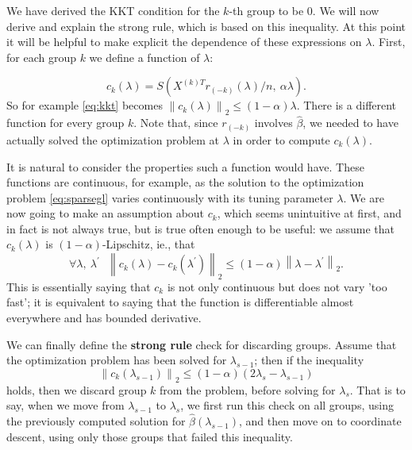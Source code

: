 \documentclass[12pt]{article}
\newcommand{\norm}[1]{\left\lVert #1 \right\rVert}
\begin{document}
We have derived the KKT condition for the $k$-th group to be $0$. We will now derive and explain the strong rule, which is based on this inequality. At this point it will be helpful to make explicit the dependence of these expressions on $\lambda$. First, for each group $k$ we define a function of $\lambda$:

\begin{equation}
c_k(\lambda) = S(X^{(k)T}r_{(-k)}(\lambda)/n,\ \alpha\lambda).
\end{equation}
So for example \autoref{eq:kkt} becomes $\norm{c_k(\lambda)}_2 \leq (1-\alpha)\lambda$. There is a different function for every group $k$. Note that, since $r_{(-k)}$ involves $\hat{\beta}$, we needed to have actually solved the optimization problem at $\lambda$ in order to compute $c_k(\lambda)$.

It is natural to consider the properties such a function would have. These functions are continuous, for example, as the solution to the optimization problem \autoref{eq:sparsegl} varies continuously with its tuning parameter $\lambda$. We are now going to make an assumption about $c_k$, which seems unintuitive at first, and in fact is not always true, but is true often enough to be useful: we assume that $c_k(\lambda)$ is $(1-\alpha)$-Lipschitz, ie., that
\begin{equation}
\label{eq:lipschitz}
\forall \lambda,\ \lambda^{\prime}\ \  \ \norm{c_k(\lambda)-c_k(\lambda^{\prime})}_2 \leq (1-\alpha)\norm{\lambda - \lambda^{\prime}}_2.
\end{equation}
This is essentially saying that $c_k$ is not only continuous but does not vary 'too fast'; it is equivalent to saying that the function is differentiable almost everywhere and has bounded derivative.


We can finally define the \textbf{strong rule} check for discarding groups. Assume that the optimization problem has been solved for $\lambda_{s-1}$; then if the inequality
\begin{equation}
\label{eq:strong}
\norm{c_k(\lambda_{s-1})}_2 \leq (1-\alpha)(2\lambda_s - \lambda_{s-1})
\end{equation}
holds, then we discard group $k$ from the problem, before solving for $\lambda_s$. That is to say, when we move from $\lambda_{s-1}$ to $\lambda_s$, we first run this check on all groups, using the previously computed solution for $\hat{\beta}(\lambda_{s-1})$, and then move on to coordinate descent, using only those groups that failed this inequality.
\end{document}
